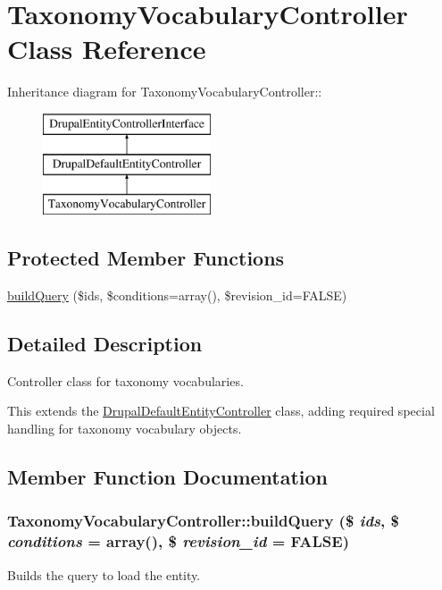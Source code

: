 \hypertarget{classTaxonomyVocabularyController}{
\section{TaxonomyVocabularyController Class Reference}
\label{classTaxonomyVocabularyController}
}
Inheritance diagram for TaxonomyVocabularyController::\begin{figure}[H]
\begin{center}
\leavevmode
\includegraphics[height=3cm]{classTaxonomyVocabularyController}
\end{center}
\end{figure}
\subsection*{Protected Member Functions}
\begin{DoxyCompactItemize}
\item 
\hyperlink{classTaxonomyVocabularyController_a9472e3b979afabb2f1f08fb2cd0f83b8}{buildQuery} (\$ids, \$conditions=array(), \$revision\_\-id=FALSE)
\end{DoxyCompactItemize}


\subsection{Detailed Description}
Controller class for taxonomy vocabularies.

This extends the \hyperlink{classDrupalDefaultEntityController}{DrupalDefaultEntityController} class, adding required special handling for taxonomy vocabulary objects. 

\subsection{Member Function Documentation}
\hypertarget{classTaxonomyVocabularyController_a9472e3b979afabb2f1f08fb2cd0f83b8}{
\subsubsection[{buildQuery}]{\setlength{\rightskip}{0pt plus 5cm}TaxonomyVocabularyController::buildQuery (\$ {\em ids}, \/  \$ {\em conditions} = {\ttfamily array()}, \/  \$ {\em revision\_\-id} = {\ttfamily FALSE})}}
\label{classTaxonomyVocabularyController_a9472e3b979afabb2f1f08fb2cd0f83b8}
Builds the query to load the entity.

